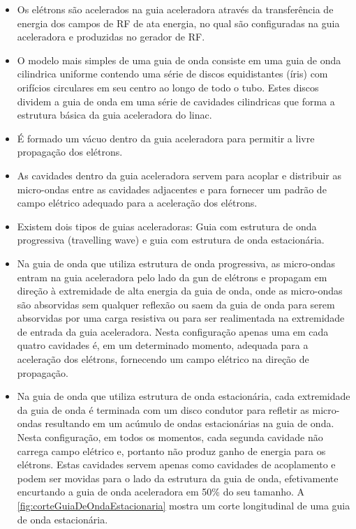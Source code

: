 \documentclass[11pt,a4paper]{article}
\begin{document}
                    \begin{itemize}
                        \item Os elétrons são acelerados na guia aceleradora através da transferência de energia dos campos de RF de ata energia, no qual são configuradas na guia aceleradora e produzidas no gerador de RF. 
                        
                        \item O modelo mais simples de uma guia de onda consiste em uma guia de onda cilindrica uniforme contendo uma  série de discos equidistantes (íris) com orifícios circulares em seu centro ao longo de todo o tubo. Estes discos dividem a guia de onda em uma série de cavidades cilindricas que forma a estrutura básica da guia aceleradora do linac. 
                        
                        \item É formado um vácuo dentro da guia aceleradora para permitir a livre propagação dos elétrons.
                        
                        \item As cavidades dentro da guia aceleradora servem para acoplar e distribuir as micro-ondas entre as cavidades adjacentes e para fornecer um padrão de campo elétrico adequado para a aceleração dos elétrons.
                        
                        \item Existem dois tipos de guias aceleradoras: Guia com estrutura de onda progressiva (travelling wave) e guia com estrutura de onda estacionária.
                        
                        \item Na guia de onda que utiliza estrutura de onda progressiva, as micro-ondas entram na guia aceleradora pelo lado da gun de elétrons e propagam em direção à extremidade de alta energia da guia de onda, onde as micro-ondas são absorvidas sem qualquer reflexão ou saem da guia de onda para serem absorvidas por uma carga resistiva ou para ser realimentada na extremidade de entrada da guia aceleradora. Nesta configuração apenas uma em cada quatro cavidades é, em um determinado momento, adequada para a aceleração dos elétrons, fornecendo um campo elétrico na direção de propagação.
                        
                        \item Na guia de onda que utiliza estrutura de onda estacionária, cada extremidade da guia de onda é terminada com um disco condutor para refletir as micro-ondas resultando em um acúmulo de ondas estacionárias na guia de onda. Nesta configuração, em todos os momentos, cada segunda cavidade não carrega campo elétrico e, portanto não produz ganho de energia para os elétrons. Estas cavidades servem apenas como cavidades de acoplamento e podem ser movidas para o lado da estrutura da guia de onda, efetivamente encurtando a guia de onda aceleradora em 50\% do seu tamanho. A \ref{fig:corteGuiaDeOndaEstacionaria} mostra um corte longitudinal de uma guia de onda estacionária.
                    \end{itemize}
\end{document}
